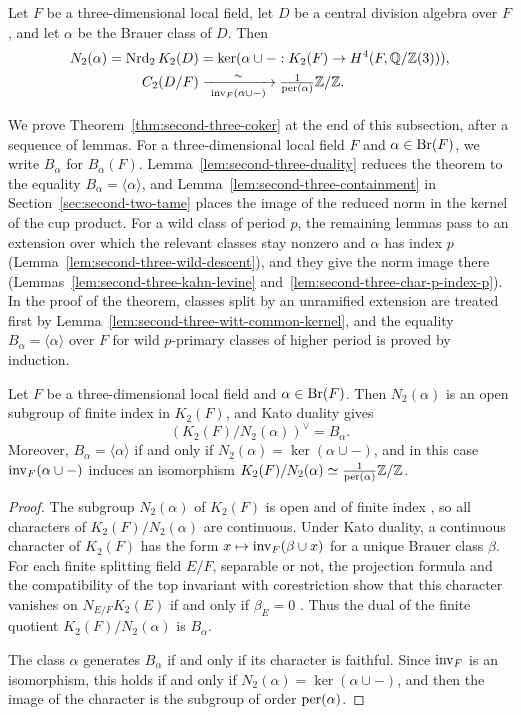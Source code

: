\begin{theorem}\label{thm:second-three-coker}
Let $F$ be a three-dimensional local field, let $D$ be a central division algebra over $F$, and let $\alpha$ be the Brauer class of $D$.
Then
\[
\begin{aligned}
 N_2(\alpha)=\operatorname{Nrd}_2K_2(D)
       &=\ker(\alpha\cup-:K_2(F)\to H^4(F,\mathbb Q/\mathbb Z(3))),\\
 C_2(D/F)&\xrightarrow[\ \operatorname{inv}_F(\alpha\cup-)\ ]{\ \sim\ }
       \tfrac{1}{\operatorname{per}(\alpha)}\mathbb Z/\mathbb Z .
\end{aligned}
\]
\end{theorem}

We prove Theorem~\ref{thm:second-three-coker} at the end of this subsection, after a sequence of lemmas.
For a three-dimensional local field $F$ and $\alpha\in\operatorname{Br}(F)$, we write $B_\alpha$ for $B_\alpha(F)$.
Lemma~\ref{lem:second-three-duality} reduces the theorem to the equality $B_\alpha=\langle\alpha\rangle$, and Lemma~\ref{lem:second-three-containment} in Section~\ref{sec:second-two-tame} places the image of the reduced norm in the kernel of the cup product.
For a wild class of period $p$, the remaining lemmas pass to an extension over which the relevant classes stay nonzero and $\alpha$ has index $p$ (Lemma~\ref{lem:second-three-wild-descent}), and they give the norm image there (Lemmas~\ref{lem:second-three-kahn-levine} and~\ref{lem:second-three-char-p-index-p}).
In the proof of the theorem, classes split by an unramified extension are treated first by Lemma~\ref{lem:second-three-witt-common-kernel}, and the equality $B_\alpha=\langle\alpha\rangle$ over $F$ for wild $p$-primary classes of higher period is proved by induction.

\begin{lemma}\label{lem:second-three-duality}
Let $F$ be a three-dimensional local field and $\alpha\in\operatorname{Br}(F)$.
Then $N_2(\alpha)$ is an open subgroup of finite index in $K_2(F)$, and Kato duality gives
\[
 (K_2(F)/N_2(\alpha))^\vee=B_\alpha .
\]
Moreover, $B_\alpha=\langle\alpha\rangle$ if and only if $N_2(\alpha)=\ker(\alpha\cup-)$, and in this case $\operatorname{inv}_F(\alpha\cup-)$ induces an isomorphism $K_2(F)/N_2(\alpha)\simeq\tfrac1{\operatorname{per}(\alpha)}\mathbb Z/\mathbb Z$.
\end{lemma}
\begin{proof}
The subgroup $N_2(\alpha)$ of $K_2(F)$ is open and of finite index \cite[Theorems 2--3]{KatoExistence}, so all characters of $K_2(F)/N_2(\alpha)$ are continuous.
Under Kato duality, a continuous character of $K_2(F)$ has the form $x\mapsto\operatorname{inv}_F(\beta\cup x)$ for a unique Brauer class $\beta$.
For each finite splitting field $E/F$, separable or not, the projection formula and the compatibility of the top invariant with corestriction show that this character vanishes on $N_{E/F}K_2(E)$ if and only if $\beta_E=0$ \cite[\S3.2, Lemma 1(2) and Proposition 1(2)(ii)]{KatoLocalII}.
Thus the dual of the finite quotient $K_2(F)/N_2(\alpha)$ is $B_\alpha$.

The class $\alpha$ generates $B_\alpha$ if and only if its character is faithful.
Since $\operatorname{inv}_F$ is an isomorphism, this holds if and only if $N_2(\alpha)=\ker(\alpha\cup-)$, and then the image of the character is the subgroup of order $\operatorname{per}(\alpha)$.
\end{proof}

